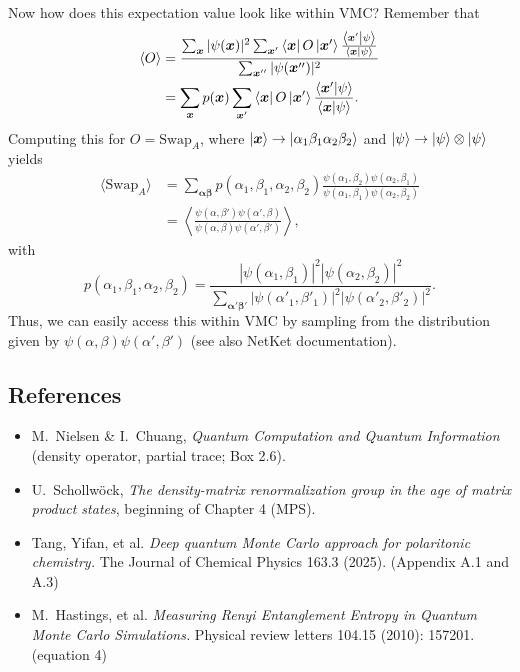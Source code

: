 \documentclass[../../main.tex]{subfiles}
\begin{document}
Now how does this expectation value look like within VMC? Remember that
\begin{align*}
      \langle O \rangle &= \frac{\sum_{\bm x} |\psi(\bm x)|^2 \sum_{\bm x'} \left\langle \bm x \right\rvert  O \left\lvert \bm x' \right\rangle \frac{\left\langle \bm x' \middle| \psi \right\rangle}{\left\langle \bm x \middle| \psi \right\rangle}}{\sum_{\bm x''} |\psi(\bm x'')|^2} \\
      &= \sum_{\bm x} p(\bm x) \sum_{\bm x'} \left\langle \bm x \right\rvert  O \left\lvert \bm x' \right\rangle \frac{\left\langle \bm x' \middle| \psi \right\rangle}{\left\langle \bm x \middle| \psi \right\rangle} .
\end{align*}
Computing this for $O=\text{Swap}_A$, where $\left\lvert \bm x \right\rangle \rightarrow \left\lvert \alpha_1 \beta_1 \alpha_2 \beta_2 \right\rangle$ and $\left\lvert \psi \right\rangle \rightarrow \left\lvert \psi \right\rangle \otimes \left\lvert \psi \right\rangle$ yields
\begin{align}
      \langle \text{Swap}_A \rangle &= \sum_{\bm \alpha \bm \beta} p(\alpha_1, \beta_1, \alpha_2, \beta_2) \frac{\psi(\alpha_1, \beta_2) \psi(\alpha_2, \beta_1)}{\psi(\alpha_1, \beta_1) \psi(\alpha_2, \beta_2)} \\
      &= \left\langle \frac{\psi(\alpha, \beta') \psi(\alpha', \beta)}{\psi(\alpha, \beta) \psi(\alpha', \beta')} \right\rangle ,
\end{align}  
with 
\begin{equation*}
      p(\alpha_1, \beta_1, \alpha_2, \beta_2) = \frac{|\psi(\alpha_1, \beta_1)|^2 |\psi(\alpha_2, \beta_2)|^2}{\sum_{\bm \alpha' \bm \beta'}|\psi(\alpha'_1, \beta'_1)|^2 |\psi(\alpha'_2, \beta'_2)|^2} .
\end{equation*}
Thus, we can easily access this within VMC by sampling from the distribution given by $\psi(\alpha, \beta) \psi(\alpha', \beta')$ (see also NetKet documentation). 

\subsection{References}
\begin{itemize}
      \item M.\ Nielsen \& I.\ Chuang, \emph{Quantum Computation and Quantum Information}
      (density operator, partial trace; Box 2.6).
      \item U.\ Schollw\"ock, \emph{The density-matrix renormalization group in the age of matrix
            product states}, beginning of Chapter 4 (MPS).
      \item Tang, Yifan, et al. \emph{Deep quantum Monte Carlo approach for polaritonic chemistry.} The Journal of Chemical Physics 163.3 (2025). (Appendix A.1 and A.3)
      \item M.\ Hastings, et al. \emph{Measuring Renyi Entanglement Entropy in Quantum Monte Carlo Simulations.} Physical review letters 104.15 (2010): 157201. (equation 4)
\end{itemize}
\end{document}
